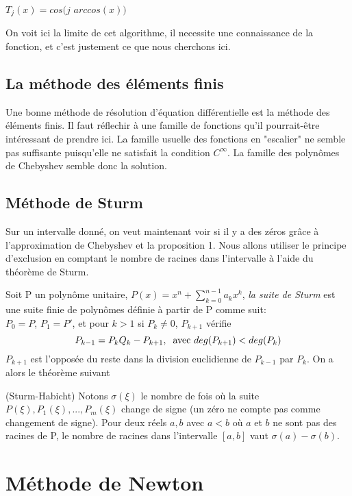 \documentclass[a4paper,10.5pt]{article}
\begin{document}
	\noindent $T_{j}(x)=cos(j$  $arccos(x))$
	
	\noindent On voit ici la limite de cet algorithme, il necessite une connaissance de la fonction, et c'est justement ce que nous cherchons ici.
	
	\subsection{La méthode des éléments finis}
	
	Une bonne méthode de résolution d'équation différentielle est la méthode des éléments finis. Il faut réflechir à une famille de fonctions qu'il pourrait-être intéressant de prendre ici. La famille usuelle des fonctions en "escalier" ne semble pas suffisante puisqu'elle ne satisfait la condition $C^{\infty}$.
	La famille des polynômes de Chebyshev semble donc la solution.
	
	\subsection{Méthode de Sturm}
	
	Sur un intervalle donné, on veut maintenant voir si il y a des zéros grâce à l'approximation de Chebyshev et la proposition 1. Nous allons utiliser le principe d'exclusion en comptant le nombre de racines dans l'intervalle à l'aide du théorème de Sturm.
	
	
	Soit P un polynôme unitaire, $P(x)=x^{n} + \sum^{n-1}_{k=0}a_{k}x^{k}$, \textit {la suite de Sturm} est une suite finie de polynômes définie à partir de P comme suit:\\
	$P_{0}=P$, $P_{1}=P'$, et pour $k > 1$ si $P_{k} \neq 0$,  $P_{k+1}$ vérifie
	\[P_{k-1}=P_{k}Q_{k}-P_{k+1},\hspace{2mm}\text{avec }    deg(P_{k+1})<deg(P_{k})\] 
	$P_{k+1}$ est l'opposée du reste dans la division euclidienne de $P_{k-1}$ par $P_{k}$. On a alors le théorème suivant 
	

	\begin{theorem}(Sturm-Habicht)
		Notons $\sigma(\xi)$ le nombre de fois où la suite $P(\xi),P_{1}(\xi),...,P_{m}(\xi)$ change de signe (un zéro ne compte pas comme changement de signe).
		Pour deux réels $a,b$ avec $a<b$ où $a$ et $b$ ne sont pas des racines de P, le nombre de racines dans l'intervalle $[a,b]$ vaut
		$\sigma(a)-\sigma(b)$.
	\end{theorem}
	
	\section{Méthode de Newton}
	
\end{document}
